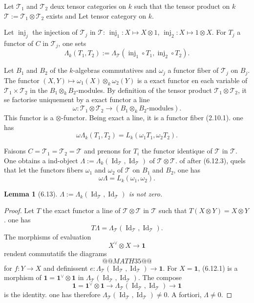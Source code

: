 \documentclass[12pt,a4paper]{article}
\theoremstyle{plain}
\newtheorem{lemma}[theorem]{Lemma}
\theoremstyle{definition}
\DeclareMathOperator{\Id}{Id}
\DeclareMathOperator{\inj}{inj}
\begin{document}
Let $\mathcal{T}_1$ and $\mathcal{T}_2$ deux tensor categories on $k$ such that the tensor product on $k$ $\mathcal{T} := \mathcal{T}_1 \otimes \mathcal{T}_2$ exists and Let tensor category on $k$.

Let $\inj_j$ the injection of $\mathcal{T}_j$ in $\mathcal{T}$: $\inj_1 : X \mapsto X \otimes 1$, $\inj_2 : X \mapsto 1 \otimes X$. For $T_j$ a functor of $C$ in $\mathcal{T}_j$, one sets
\[
\Lambda_k(T_1, T_2) := \Lambda_\mathcal{T}(\inj_1 \circ T_1, \inj_2 \circ T_2).
\]

Let $B_1$ and $B_2$ of the $k$-algebras commutatives and $\omega_j$ a functor fiber of $\mathcal{T}_j$ on $B_j$. The functor $(X, Y) \mapsto \omega_1(X) \otimes_k \omega_2(Y)$ is a exact functor en each variable of $\mathcal{T}_1 \times \mathcal{T}_2$ in the $B_1 \otimes_k B_2$-modules. By definition of the tensor product $\mathcal{T}_1 \otimes \mathcal{T}_2$, it se factorise uniquement by a exact functor a line
\[
\omega : \mathcal{T}_1 \otimes \mathcal{T}_2 \to (B_1 \otimes_k B_2\text{-modules}).
\]
This functor is a $\otimes$-functor. Being exact a line, it is a functor fiber (2.10.1). one has
\begin{equation}\label{eq:6.12.3}
\omega \Lambda_k(T_1, T_2) = L_k(\omega_1 T_1, \omega_2 T_2).
\end{equation}

Faisons $C = \mathcal{T}_1 = \mathcal{T}_2 = \mathcal{T}$ and prenons for $T_i$ the functor identique of $\mathcal{T}$ in $\mathcal{T}$. One obtains a ind-object $\Lambda := \Lambda_k(\Id_\mathcal{T}, \Id_\mathcal{T})$ of $\mathcal{T} \otimes \mathcal{T}$. of after (6.12.3), quels that let the functors fibers $\omega_1$ and $\omega_2$ of $\mathcal{T}$ on $B_1$ and $B_2$, one has
\begin{equation}\label{eq:6.12.4}
\omega \Lambda = L_k(\omega_1, \omega_2).
\end{equation}

\begin{lemma}[6.13]
$\Lambda := \Lambda_k(\Id_\mathcal{T}, \Id_\mathcal{T})$ is not zero.
\end{lemma}

\begin{proof}
Let $T$ the exact functor a line of $\mathcal{T} \otimes \mathcal{T}$ in $\mathcal{T}$ such that $T(X \otimes Y) = X \otimes Y$. one has
\[
T\Lambda = \Lambda_\mathcal{T}(\Id_\mathcal{T}, \Id_\mathcal{T}).
\]
The morphisms of evaluation
\[
X^\vee \otimes X \to \mathbf{1}
\]
rendent commutatifs the diagrams
\[
@@MATH35@@
\]
for $f : Y \to X$ and definissent $e : \Lambda_\mathcal{T}(\Id_\mathcal{T}, \Id_\mathcal{T}) \to \mathbf{1}$. For $X = \mathbf{1}$, (6.12.1) is a morphism of $\mathbf{1} = \mathbf{1}^\vee \otimes \mathbf{1}$ in $\Lambda_\mathcal{T}(\Id_\mathcal{T}, \Id_\mathcal{T})$. The compose
\[
\mathbf{1} = \mathbf{1}^\vee \otimes \mathbf{1} \to \Lambda_\mathcal{T}(\Id_\mathcal{T}, \Id_\mathcal{T}) \to \mathbf{1}
\]
is the identity. one has therefore $\Lambda_\mathcal{T}(\Id_\mathcal{T}, \Id_\mathcal{T}) \neq 0$. A fortiori, $\Lambda \neq 0$.
\end{proof}
\end{document}
